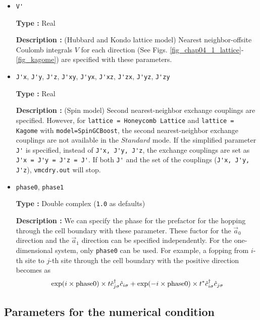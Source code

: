 \begin{itemize}
\item \verb|V'|

{\bf Type :} Real

{\bf Description :} (Hubbard and Kondo lattice model)
Nearest neighbor-offsite Coulomb integrals $V$
 for each direction
(See Figs. \ref{fig_chap04_1_lattice}-\ref{fig_kagome})
are specified with these parameters.

\item \verb|J'x|, \verb|J'y|, \verb|J'z|, \verb|J'xy|, 
  \verb|J'yx|, \verb|J'xz|, \verb|J'zx|, \verb|J'yz|, \verb|J'zy|

{\bf Type :} Real

{\bf Description :} (Spin model)
Second nearest-neighbor exchange couplings are specified.
However, for \verb|lattice = Honeycomb Lattice| and  \verb|lattice = Kagome|
with \verb|model=SpinGCBoost|,
the second nearest-neighbor exchange couplings are not available in the $Standard$ mode.
If the simplified parameter \verb|J'| is specified, instead of
\verb|J'x, J'y, J'z|,
the exchange couplings are set as
\verb|J'x = J'y = J'z = J'|.
If both \verb|J'| and the set of the couplings (\verb|J'x, J'y, J'z|),
\verb|vmcdry.out| will stop.

\item \verb|phase0|, \verb|phase1|

  {\bf Type :} Double complex (\verb|1.0| as defaults)
  
  {\bf Description :}
  We can specify the phase for the prefactor for the hopping through the cell boundary
  with these parameter.
  These fuctor for the $\vec{a}_0$ direction and the $\vec{a}_1$ direction can be specified independently.
  For the one-dimensional system, only \verb|phase0| can be used.
  For example, a fopping from $i$-th site to $j$-th site through the cell boundary with the positive direction
  becomes as 
  \begin{align}
    \exp(i \times {\rm phase0}) \times t {\hat c}_{j \sigma}^\dagger {\hat c}_{i \sigma}
    + \exp(-i \times {\rm phase0}) \times t^* {\hat c}_{i \sigma}^\dagger {\hat c}_{j \sigma}
  \end{align}

\end{itemize}

\subsection{Parameters for the numerical condition}

